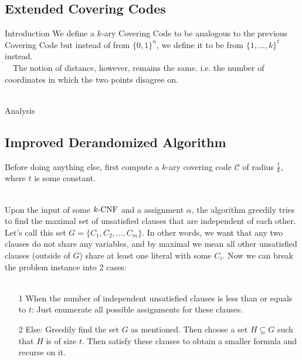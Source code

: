 \documentclass[pdf] {beamer}
\newcommand{\CNF}{\textnormal{$k$-CNF}}
\begin{document}
	\subsection{Extended Covering Codes}
	\begin{frame}{Introduction}
	We define a $k$-ary Covering Code to be analogous to the previous Covering Code but instead of from $\{0,1\}^n$, we define it to be from $\{1,...,k\}^t$ instead. \\~\
	The notion of distance, however, remains the same. i.e. the number of coordinates in which the two points disagree on.\\~\
	\end{frame}
	\begin{frame}{Analysis}
	
	\end{frame}
	\subsection{Improved Derandomized Algorithm}
	\begin{frame}
	Before doing anything else, first compute a $k$-ary covering code $\mathcal{C}$ of radius $\frac{t}{k}$, where $t$ is some constant. \\~\
	
	Upon the input of some $\CNF$ and a assignment $\alpha$, the algorithm greedily tries to find the maximal set of unsatisfied clauses that are independent of each other. Let's call this set $G = \{C_1, C_2, ...,C_m\}$. In other words, we want that any two clauses do not share any variables, and by maximal we mean all other unsatisfied clauses (outside of $G$) share at least one literal with some $C_i$. Now we can break the problem instance into 2 cases: \\~\
	\end{frame}
	\begin{frame}
		\begin{enumerate}
			\item[1] When the number of independent unsatisfied clauses is less than or equals to $t$: Just enumerate all possible assignments for these clauses.
			\item[2] Else: Greedily find the set $G$ as mentioned. Then choose a set $H \subseteq G$ such that $H$ is of size $t$. Then satisfy these clauses to obtain a smaller formula and recurse on it. 
		\end{enumerate}
	\end{frame}		
\end{document}
